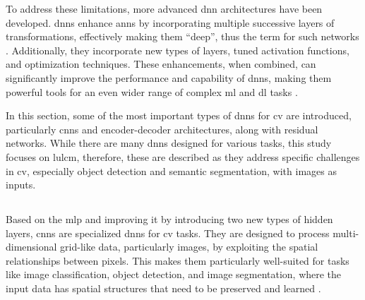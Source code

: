 To address these limitations, more advanced \gls{dnn} architectures have been developed. \glspl{dnn} enhance \glspl{ann} by incorporating multiple successive layers of transformations, effectively making them \enquote{deep}, thus the term for such networks \autocite{Goodfellow.Bengio.ea2016,LeCun.Bengio.ea2015}. Additionally, they incorporate new types of layers, tuned activation functions, and optimization techniques. These enhancements, when combined, can significantly improve the performance and capability of \glspl{dnn}, making them powerful tools for an even wider range of complex \gls{ml} and \gls{dl} tasks \autocite{Bernard2021,Nielsen2015,Szeliski2022,Zhang.Lipton.ea2023}.

In this section, some of the most important types of \glspl{dnn} for \gls{cv} are introduced, particularly \glspl{cnn} and encoder-decoder architectures, along with residual networks. While there are many \glspl{dnn} designed for various tasks, this study focuses on \gls{lulcm}, therefore, these are described as they address specific challenges in \gls{cv}, especially object detection and semantic segmentation, with images as inputs.

\subsection{}

Based on the \gls{mlp} and improving it by introducing two new types of hidden layers, \glspl{cnn} are specialized \glspl{dnn} for \gls{cv} tasks. They are designed to process multi-dimensional grid-like data, particularly images, by exploiting the spatial relationships between pixels. This makes them particularly well-suited for tasks like image classification, object detection, and image segmentation, where the input data has spatial structures that need to be preserved and learned \autocite{LeCun.Kavukcuoglu.ea2010,Szeliski2022}.

